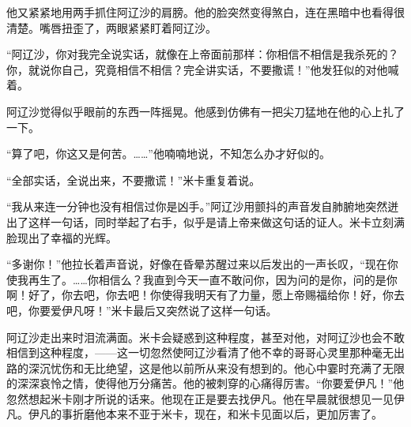 \par 他又紧紧地用两手抓住阿辽沙的肩膀。他的脸突然变得煞白，连在黑暗中也看得很清楚。嘴唇扭歪了，两眼紧紧盯着阿辽沙。
\par “阿辽沙，你对我完全说实话，就像在上帝面前那样：你相信不相信是我杀死的？你，就说你自己，究竟相信不相信？完全讲实话，不要撒谎！”他发狂似的对他喊着。
\par 阿辽沙觉得似乎眼前的东西一阵摇晃。他感到仿佛有一把尖刀猛地在他的心上扎了一下。
\par “算了吧，你这又是何苦。……”他喃喃地说，不知怎么办才好似的。
\par “全部实话，全说出来，不要撒谎！”米卡重复着说。
\par “我从来连一分钟也没有相信过你是凶手。”阿辽沙用颤抖的声音发自肺腑地突然迸出了这样一句话，同时举起了右手，似乎是请上帝来做这句话的证人。米卡立刻满脸现出了幸福的光辉。
\par “多谢你！”他拉长着声音说，好像在昏晕苏醒过来以后发出的一声长叹，“现在你使我再生了。……你相信么？我直到今天一直不敢问你，因为问的是你，问的是你啊！好了，你去吧，你去吧！你使得我明天有了力量，愿上帝赐福给你！好，你去吧，你要爱伊凡呀！”米卡最后又突然说了这样一句话。
\par 阿辽沙走出来时泪流满面。米卡会疑惑到这种程度，甚至对他，对阿辽沙也会不敢相信到这种程度，——这一切忽然使阿辽沙看清了他不幸的哥哥心灵里那种毫无出路的深沉忧伤和无比绝望，这是他以前所从来没有想到的。他心中霎时充满了无限的深深哀怜之情，使得他万分痛苦。他的被刺穿的心痛得厉害。“你要爱伊凡！”他忽然想起米卡刚才所说的话来。他现在正是要去找伊凡。他在早晨就很想见一见伊凡。伊凡的事折磨他本来不亚于米卡，现在，和米卡见面以后，更加厉害了。
